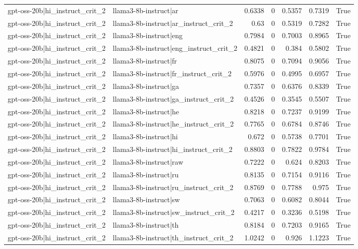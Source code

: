 \begin{table}
\begin{tabular}{l l r r r r l}
gpt-oss-20b|hi_instruct_crit_2 & llama3-8b-instruct|ar & 0.6338 & 0 & 0.5357 & 0.7319 & True \\
gpt-oss-20b|hi_instruct_crit_2 & llama3-8b-instruct|ar_instruct_crit_2 & 0.63 & 0 & 0.5319 & 0.7282 & True \\
gpt-oss-20b|hi_instruct_crit_2 & llama3-8b-instruct|eng & 0.7984 & 0 & 0.7003 & 0.8965 & True \\
gpt-oss-20b|hi_instruct_crit_2 & llama3-8b-instruct|eng_instruct_crit_2 & 0.4821 & 0 & 0.384 & 0.5802 & True \\
gpt-oss-20b|hi_instruct_crit_2 & llama3-8b-instruct|fr & 0.8075 & 0 & 0.7094 & 0.9056 & True \\
gpt-oss-20b|hi_instruct_crit_2 & llama3-8b-instruct|fr_instruct_crit_2 & 0.5976 & 0 & 0.4995 & 0.6957 & True \\
gpt-oss-20b|hi_instruct_crit_2 & llama3-8b-instruct|ga & 0.7357 & 0 & 0.6376 & 0.8339 & True \\
gpt-oss-20b|hi_instruct_crit_2 & llama3-8b-instruct|ga_instruct_crit_2 & 0.4526 & 0 & 0.3545 & 0.5507 & True \\
gpt-oss-20b|hi_instruct_crit_2 & llama3-8b-instruct|he & 0.8218 & 0 & 0.7237 & 0.9199 & True \\
gpt-oss-20b|hi_instruct_crit_2 & llama3-8b-instruct|he_instruct_crit_2 & 0.7765 & 0 & 0.6784 & 0.8746 & True \\
gpt-oss-20b|hi_instruct_crit_2 & llama3-8b-instruct|hi & 0.672 & 0 & 0.5738 & 0.7701 & True \\
gpt-oss-20b|hi_instruct_crit_2 & llama3-8b-instruct|hi_instruct_crit_2 & 0.8803 & 0 & 0.7822 & 0.9784 & True \\
gpt-oss-20b|hi_instruct_crit_2 & llama3-8b-instruct|raw & 0.7222 & 0 & 0.624 & 0.8203 & True \\
gpt-oss-20b|hi_instruct_crit_2 & llama3-8b-instruct|ru & 0.8135 & 0 & 0.7154 & 0.9116 & True \\
gpt-oss-20b|hi_instruct_crit_2 & llama3-8b-instruct|ru_instruct_crit_2 & 0.8769 & 0 & 0.7788 & 0.975 & True \\
gpt-oss-20b|hi_instruct_crit_2 & llama3-8b-instruct|sw & 0.7063 & 0 & 0.6082 & 0.8044 & True \\
gpt-oss-20b|hi_instruct_crit_2 & llama3-8b-instruct|sw_instruct_crit_2 & 0.4217 & 0 & 0.3236 & 0.5198 & True \\
gpt-oss-20b|hi_instruct_crit_2 & llama3-8b-instruct|th & 0.8184 & 0 & 0.7203 & 0.9165 & True \\
gpt-oss-20b|hi_instruct_crit_2 & llama3-8b-instruct|th_instruct_crit_2 & 1.0242 & 0 & 0.926 & 1.1223 & True \\

\end{tabular}
\end{table}
